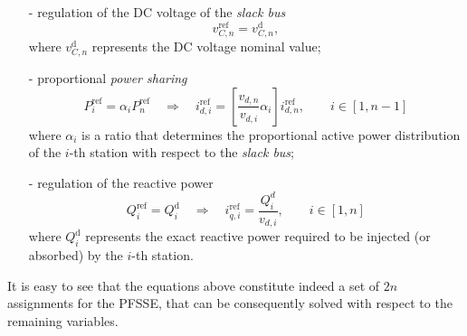 \documentclass[5p,twocolumn]{elsarticle}
\numberwithin{equation}{section}
\begin{document}
\begin{itemize}
\item[-] regulation of the DC voltage of the \textit{slack bus}
\begin{equation*}\label{DCV}
v^{\mathrm{ref}}_{C,n}=v^{\mathrm{d}}_{C,n},
\end{equation*}
where $v_{C,n}^{\mathrm{d}}$ represents the DC voltage nominal value;
\item[-] proportional \textit{power sharing}
\begin{equation*}\label{Ps2}
P_{i}^{\mathrm{ref}}=\alpha _{i} P_n^{\mathrm{ref}}\quad\Rightarrow\quad i^{\mathrm{ref}}_{d,i}=\left[\frac{v_{d,n}}{v_{d,i}}\alpha_{i}\right] i^{\mathrm{ref}}_{d,n},\qquad i\in[1,n-1]
\end{equation*}
where $\alpha_{i}$ is a ratio that determines the proportional active power distribution of the $i$-th station with respect to the \textit{slack bus};
\item[-] regulation of the reactive power
\begin{equation*}\label{react}
Q_i^{\mathrm{ref}}=Q_i^\mathrm{d}\quad\Rightarrow\quad i^{\mathrm{ref}}_{q,i}=\frac{Q^{d}_i}{v_{d,i}},\qquad i\in[1,n]
\end{equation*}
where $Q^\mathrm{d}_i$ represents the exact reactive power required to be injected (or absorbed) by the $i$-th station.
\end{itemize}

It is easy to see that the equations above constitute indeed a set of $2n$ assignments for the PFSSE, that can be consequently solved with respect to the remaining variables.
\end{document}
